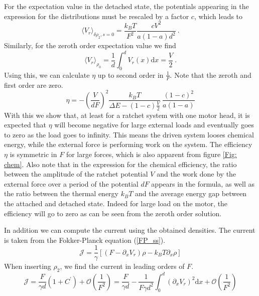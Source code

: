 \documentclass[aps,pre,onecolumn,showpacs,showkeys,a4paper]{revtex4}
\newcommand{\rmd}{{\mathrm d}}
\begin{document}
For the expectation value in the detached state, the potentials appearing in the expression for the distributions must be rescaled by a factor $c$, which leads to
\begin{equation}
\langle V_r \rangle_{\delta\rho_2, s=0} = \frac{k_B T}{F^2}\frac{cV^2}{a\left(1-a\right)d^2}\ .
\end{equation}
Similarly, for the zeroth order expectation value we find
\begin{equation}
\langle V_r \rangle_{\rho_0} = \frac{1}{d}\int_0^d V_r(x)\rmd x = \frac{V}{2}\ .
\end{equation}
Using this, we can calculate $\eta$ up to second order in $\frac{1}{F}$. 
Note that the zeroth and first order are zero.
\begin{equation}
\eta = -\left(\frac{V}{dF}\right)^2\frac{k_BT}{\Delta E - (1-c)\frac{V}{2}}\ \frac{\left(1-c\right)^2}{a(1-a)}
\end{equation}
With this we show that, at least for a ratchet system with one motor head, it is expected that $\eta$ will become negative for large external loads and eventually goes to zero as the load goes to infinity. 
This means the driven system looses chemical energy, while the external force is performing work on the system. 
The efficiency $\eta$ is symmetric in $F$ for large forces, which is also apparent from figure \ref{Fig: chem}. 
Also note that in the expression for the chemical efficiency, the ratio between the amplitude of the ratchet potential $V$ and the work done by the external force over a period of the potential $dF$ appears in the formula, as well as the ratio between the thermal energy $k_BT$ and the average energy gap between the attached and detached state. 
Indeed for large load on the motor, the efficiency will go to zero as can be seen from the zeroth order solution.
\par
In addition we can compute the current using the obtained densities. 
The current is taken from the Fokker-Planck equation (\ref{FP_ss}).
\begin{equation}
\mathcal{J} = \frac{1}{\gamma}\left[\left(F - \partial_x V_r\right)\rho - k_BT\partial_x\rho\right] 
\end{equation}
When inserting $\rho_2$, we find the current in leading orders of $F$.
\begin{equation}
\mathcal{J} = \frac{F}{\gamma d}\left(1+C^\prime\right)  +  \mathcal{O}(\frac{1}{F^2}) = \frac{F}{\gamma d} - \frac{1}{F\gamma d^2}\int^d_0\left(\partial_x V_r\right)^2 \rmd x + \mathcal{O}(\frac{1}{F^2}) 
\end{equation}
\end{document}
